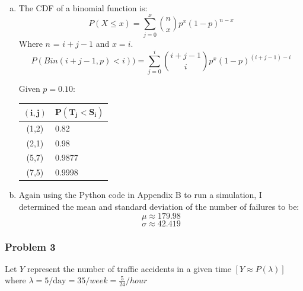 \documentclass[11pt]{extarticle}
\begin{document}
\begin{enumerate}[(a)]
\item 
The CDF of a binomial function is: $$ P(X \leq x) = \sum_{j=0}^{x} {n \choose x} p^x (1-p)^{n-x}$$
Where $n$ = $i+j-1$ and $x=i$. $$ P(Bin(i+j-1,p) < i)) = \sum_{j=0}^{i} {i+j-1 \choose i} p^x (1-p)^{(i+j-1)-i}$$

Given $p=0.10$: \begin{table}[H]
\centering
\begin{tabular}{cl}
\toprule
$\mathbf{(i,j)}$ & $\mathbf{P(T_j < S_i)}$  \\
\midrule
(1,2) & 0.82 \\
(2,1) & 0.98  \\
(5,7) & 0.9877 \\
(7,5) & 0.9998 \\
\bottomrule
\end{tabular}
\end{table}


\item Again using the Python code in Appendix B to run a simulation, I determined the mean and standard deviation of the number of failures to be: $$\mu \approx \boxed{179.98} $$ $$ \sigma \approx \boxed{42.419}$$








\end{enumerate}



\subsubsection*{Problem 3}


Let $Y$ represent the number of traffic accidents in a given time $[Y \approx P(\lambda)]$ where $\lambda = 5/\text{day} = 35/week = \frac{5}{24}/hour $
\end{document}
